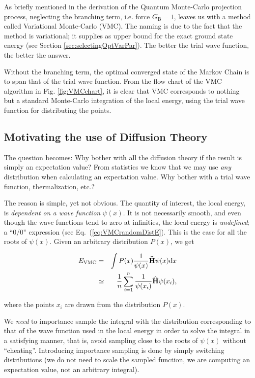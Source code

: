 As briefly mentioned in the derivation of the Quantum Monte-Carlo projection process, neglecting the branching term, i.e. force $G_\mathrm{B}=1$, leaves us with a method called Variational Monte-Carlo (VMC). The naming is due to the fact that the method is variational; it supplies as upper bound for the exact ground state energy (see Section \ref{sec:selectingOptVarPar}). The better the trial wave function, the better the answer.

Without the branching term, the optimal converged state of the Markov Chain is to span that of the trial wave function. From the flow chart of the VMC algorithm in Fig. \ref{fig:VMCchart}, it is clear that VMC corresponds to nothing but a standard Monte-Carlo integration of the local energy, using the trial wave function for distributing the points.

\subsection{Motivating the use of Diffusion Theory}

The question becomes: Why bother with all the diffusion theory if the result is simply an expectation value? From statistics we know that we may use \textit{any} distribution when calculating an expectation value. Why bother with a trial wave function, thermalization, etc.? 

The reason is simple, yet not obvious. The quantity of interest, the local energy, is \textit{dependent on a wave function} $\psi(x)$. It is not necessarily smooth, and even though the wave functions tend to zero at infinities, the local energy is \textit{undefined}; a ``$0/0$'' expression (see Eq.~(\ref{eq:VMCrandomDistE}). This is the case for all the roots of $\psi(x)$. Given an arbitrary distribution $P(x)$, we get

\begin{eqnarray}
 E_\mathrm{VMC} &=& \int P(x) \frac{1}{\psi(x)}{\bf\widehat{H}}\psi(x)\mathrm{d}x \nonumber\\
                   &\simeq& \frac{1}{n}\sum_{i=1}^n \frac{1}{\psi(x_i)}{\bf\widehat{H}}\psi(x_i), \label{eq:VMCrandomDistE}
\end{eqnarray}

where the points $x_i$ are drawn from the distribution $P(x)$.

We \textit{need} to importance sample the integral with the distribution corresponding to that of the wave function used in the local energy in order to solve the integral in a satisfying manner, that is, avoid sampling close to the roots of $\psi(x)$ without ``cheating''. Introducing importance sampling is done by simply switching distributions (we do not need to scale the sampled function, we are computing an expectation value, not an arbitrary integral).


